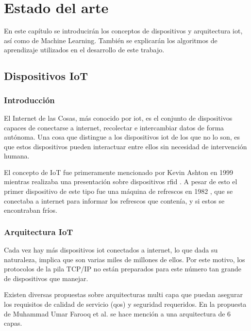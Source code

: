 
\chapter{Estado del arte} \label{chap:art}

En este capítulo se introducirán los conceptos de dispositivos y arquitectura \acrshort{iot}, así como de Machine Learning. También se explicarán los algoritmos de aprendizaje utilizados en el desarrollo de este trabajo.

\section{Dispositivos IoT}

\subsection{Introducción}

El Internet de las Cosas, más conocido por \acrfull{iot}, es el conjunto de  dispositivos capaces de conectarse a internet, recolectar e intercambiar datos de forma autónoma. Una cosa que distingue a los dispositivos \acrshort{iot} de los que no lo son, es que estos dispositivos pueden interactuar entre ellos sin necesidad de intervención humana.

El concepto de IoT fue primeramente mencionado por Kevin Ashton en 1999 mientras realizaba una presentación sobre dispositivos \acrfull{rfid} \cite{gokhale2018introduction}. A pesar de esto el primer dispositivo de este tipo fue una máquina de refrescos en 1982 \cite{cokemachine1982iot}, que se conectaba a internet para informar los refrescos que contenía, y si estos se encontraban fríos.

\subsection{Arquitectura IoT}

Cada vez hay más dispositivos \acrshort{iot} conectados a internet, lo que dada su naturaleza, implica que son varias miles de millones de ellos. Por este motivo, los protocolos de la pila TCP/IP no están preparados para este número tan grande de dispositivos que manejar.

Existen diversas propuestas sobre arquitecturas multi capa que puedan asegurar los requisitos de calidad de servicio (\acrshort{qos}) y seguridad requeridos. En la propuesta de Muhammad Umar Farooq et al. \cite{farooq2015review} se hace mención a una arquitectura de 6 capas.

